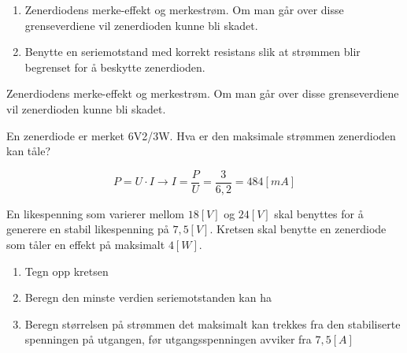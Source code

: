 \begin{solution}[name=Løsningsforslag oppgave]
\begin{enumerate}[label=\roman*)]
	\item Zenerdiodens merke-effekt og merkestrøm. Om man går over disse grenseverdiene vil zenerdioden kunne bli skadet.
	\item Benytte en seriemotstand med korrekt resistans slik at strømmen blir begrenset for å beskytte zenerdioden.
\end{enumerate}

Zenerdiodens merke-effekt og merkestrøm. Om man går over disse grenseverdiene vil zenerdioden kunne bli skadet.
\end{solution}


\begin{question}[name=Oppgave, topic=zenerdioder]
En zenerdiode er merket 6V2/3W. Hva er den maksimale strømmen zenerdioden kan tåle?
\end{question}

\vspace{0.5cm} %

\begin{solution}[name=Løsningsforslag oppgave]
\[P=U\cdot I\rightarrow I=\frac{P}{U}=\frac{3}{6,2}=484 [mA]\]
	
\end{solution}



\begin{question}[name=Oppgave, topic=zenerdioder]
En likespenning som varierer mellom $18 [V]$ og $24 [V]$ skal benyttes for å generere en stabil likespenning på $7,5 [V]$. Kretsen skal benytte en zenerdiode som tåler en effekt på maksimalt $4 [W]$.

\begin{enumerate}[label=\roman*)]
	\item Tegn opp kretsen
	\item Beregn den minste verdien seriemotstanden kan ha
	\item Beregn størrelsen på strømmen det maksimalt kan trekkes fra den stabiliserte spenningen på utgangen, før utgangsspenningen avviker fra $7,5 [A]$
\end{enumerate}
\end{question}

\vspace{0.5cm} %

